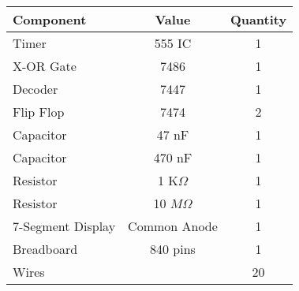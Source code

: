 \begin{tabular}{|l|c|c|}\hline
	Component &Value &Quantity\\ \hline
    Timer & 555 IC &1 \\ \hline
    X-OR Gate &7486 &1 \\ \hline
    Decoder &7447 &1 \\ \hline
    Flip Flop &7474 &2 \\ \hline
    Capacitor &47 nF &1 \\ \hline
    Capacitor &470 nF &1 \\ \hline
    Resistor &1 K$\Omega$ &1 \\ \hline
    Resistor &10 $M\Omega$ &1 \\ \hline
    7-Segment Display &Common Anode &1 \\ \hline
	Breadboard &840 pins &1 \\ \hline
	Wires & &20 \\ \hline
\end{tabular}